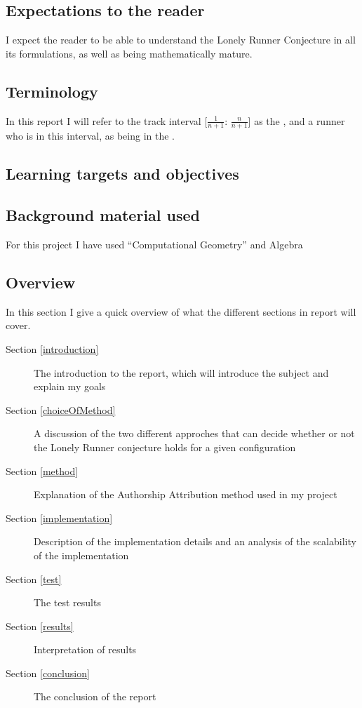 \subsection{Expectations to the reader}
\label{expectations}
I expect the reader to be able to understand the Lonely Runner Conjecture in all its formulations, as well as being mathematically mature.

\subsection{Terminology}
\label{Termonolgy}
In this report I will refer to the track interval [$\frac{1}{n + 1}$: $\frac{n}{n+1}$] as the \zone, and a runner who is in this interval, as being in the \zone.

\subsection{Learning targets and objectives}
\label{learning}

\subsection{Background material used}
\label{background}
For this project I have used ``Computational Geometry'' \cite{citeulike:3347056} and Algebra  

\subsection{Overview}

In this section I give a quick overview of what the different sections in report will cover.
\begin{description}
\item[Section \ref{introduction}] The introduction to the report, which will introduce the subject and explain my goals
\item[Section \ref{choiceOfMethod}] A discussion of the two different approches that can decide whether or not the Lonely Runner conjecture holds for a given configuration
\item[Section \ref{method}] Explanation of the Authorship Attribution method used in my project
\item[Section \ref{implementation}] Description of the implementation details and an analysis of the scalability of the implementation
\item[Section \ref{test}] The test results
\item[Section \ref{results}] Interpretation of results
\item[Section \ref{conclusion}] The conclusion of the report  
\end{description}
